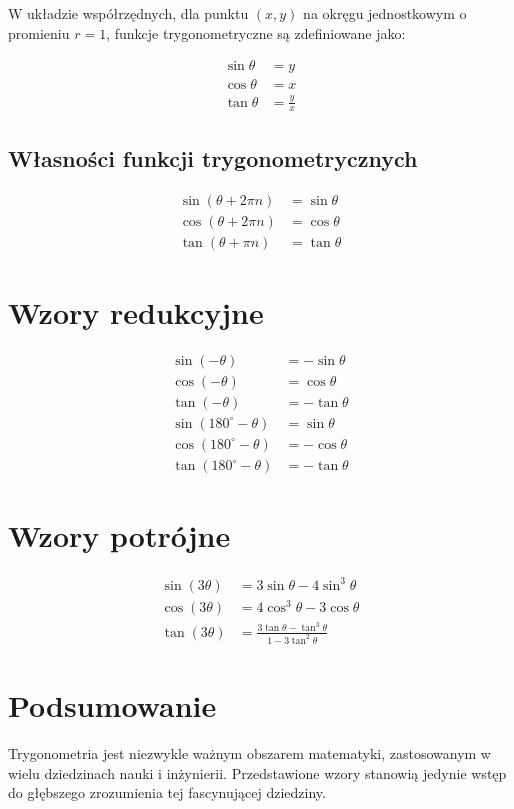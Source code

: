 \documentclass{article}
\begin{document}
W układzie współrzędnych, dla punktu $(x, y)$ na okręgu jednostkowym o promieniu $r=1$, funkcje trygonometryczne są zdefiniowane jako:

\begin{align}
    \sin \theta &= y \\
    \cos \theta &= x \\
    \tan \theta &= \frac{y}{x}
\end{align}

\subsection{Własności funkcji trygonometrycznych}

\begin{align}
    \sin(\theta + 2\pi n) &= \sin \theta \\
    \cos(\theta + 2\pi n) &= \cos \theta \\
    \tan(\theta + \pi n) &= \tan \theta
\end{align}

\section{Wzory redukcyjne}

\begin{align}
    \sin(-\theta) &= -\sin \theta \\
    \cos(-\theta) &= \cos \theta \\
    \tan(-\theta) &= -\tan \theta \\
    \sin(180^\circ - \theta) &= \sin \theta \\
    \cos(180^\circ - \theta) &= -\cos \theta \\
    \tan(180^\circ - \theta) &= -\tan \theta
\end{align}

\section{Wzory potrójne}

\begin{align}
    \sin(3\theta) &= 3\sin \theta - 4\sin^3 \theta \\
    \cos(3\theta) &= 4\cos^3 \theta - 3\cos \theta \\
    \tan(3\theta) &= \frac{3\tan \theta - \tan^3 \theta}{1 - 3\tan^2 \theta}
\end{align}

\section{Podsumowanie}

Trygonometria jest niezwykle ważnym obszarem matematyki, zastosowanym w wielu dziedzinach nauki i inżynierii. Przedstawione wzory stanowią jedynie wstęp do głębszego zrozumienia tej fascynującej dziedziny.
\end{document}
